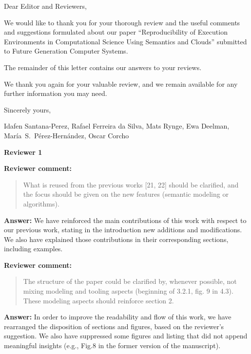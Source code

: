 \documentclass{letter}
\date{Sep 23, 2015}
\newenvironment{review}%
{\textbf{Reviewer comment:}\begin{quote}}%
{\end{quote}}%
\newcommand{\answer}[1]{%
      \textbf{Answer:} #1}
\newcommand{\revised}[1]{\emph{#1}\color{black}}
\begin{document}
\begin{letter}{}

\opening{Dear Editor and Reviewers,}

We would like to thank you for your thorough review and the useful
comments and suggestions formulated about our paper 
``Reproducibility of Execution Environments in Computational Science Using Semantics and Clouds'' 
submitted to Future Generation Computer Systems.

The remainder of this letter contains our answers to your reviews. 

We thank you again for your valuable review, and we remain available for any further information you may need.

\vspace{0.5cm}

Sincerely yours,

\vspace{1cm}

Idafen Santana-Perez, Rafael Ferreira da Silva, Mats Rynge, Ewa Deelman, Mar\'ia~S.~P\'erez-Hern\'andez, Oscar Corcho

\newpage


%
%
\textbf{Reviewer 1}

\begin{review}
What is reused from the previous works [21, 22] should be clarified, and the focus should be given on the new features (semantic modeling or algorithms).
\end{review}

\answer{We have reinforced the main contributions of this work with respect to our previous work, stating in the introduction new additions and modifications. We also have explained those contributions in their corresponding sections, including examples.}



\begin{review}
The structure of the paper could be clarified by, whenever possible, not mixing modeling and tooling aspects (beginning of 3.2.1, fig. 9 in 4.3). These modeling aspects should reinforce section 2.
\end{review}

\answer{In order to improve the readability and flow of this work, we have rearranged the disposition of sections and figures, based on the reviewer's suggestion. We also have suppressed some figures and listing that did not append meaningful insights (e.g., Fig.8 in the former version of the manuscript).}



\end{letter}
\end{document}
